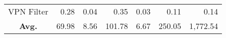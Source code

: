 \begin{table*}[]
{\begin{tabular}{crrrrrr}
VPN Filter                                               & 0.28                                                                                     & 0.04                                                                                 & 0.35                                                & 0.03                                                      & 0.11                                                & 0.14                                                      \\ 
\textbf{Avg.}                                           & 69.98                                                                                    & 8.56                                                                                 & 101.78                                              & 6.67                                                      & 250.05                                              & 1,772.54                                                  \\ \hline
\end{tabular}
}
\label{tab:rq4performance}
\end{table*}

